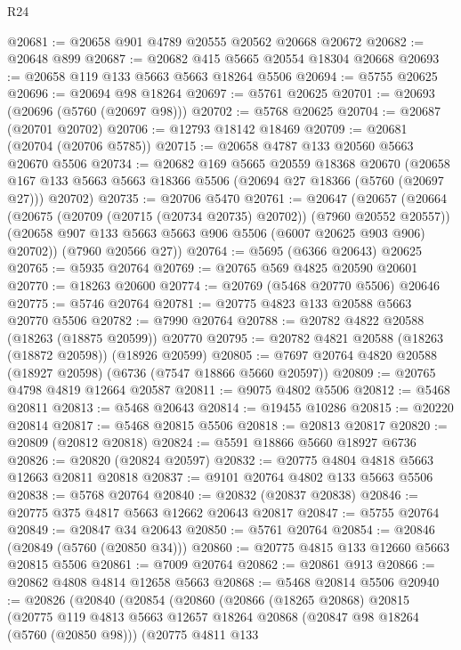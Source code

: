\begin{lexlean}{R24}
\begin{coremodule}
@20681 := @20658 @901 @4789 @20555 @20562 @20668 @20672
@20682 := @20648 @899
@20687 := @20682 @415 @5665 @20554 @18304 @20668
@20693 := @20658 @119 @133 @5663 @5663 @18264 @5506
@20694 := @5755 @20625
@20696 := @20694 @98 @18264
@20697 := @5761 @20625
@20701 := @20693 (@20696 (@5760 (@20697 @98)))
@20702 := @5768 @20625
@20704 := @20687 (@20701 @20702)
@20706 := @12793 @18142 @18469
@20709 := @20681 (@20704 (@20706 @5785))
@20715 := @20658 @4787 @133 @20560 @5663 @20670 @5506
@20734 := @20682
    @169
    @5665
    @20559
    @18368
    @20670
    (@20658 @167 @133 @5663 @5663 @18366 @5506 (@20694 @27 @18366 (@5760 (@20697 @27))) @20702)
@20735 := @20706 @5470
@20761 := @20647
    (@20657
      (@20664
        (@20675 (@20709 (@20715 (@20734 @20735) @20702)) (@7960 @20552 @20557))
        (@20658 @907 @133 @5663 @5663 @906 @5506 (@6007 @20625 @903 @906) @20702))
      (@7960 @20566 @27))
@20764 := @5695 (@6366 @20643) @20625
@20765 := @5935 @20764
@20769 := @20765 @569 @4825 @20590 @20601
@20770 := @18263 @20600
@20774 := @20769 (@5468 @20770 @5506) @20646
@20775 := @5746 @20764
@20781 := @20775 @4823 @133 @20588 @5663 @20770 @5506
@20782 := @7990 @20764
@20788 := @20782 @4822 @20588 (@18263 (@18875 @20599)) @20770
@20795 := @20782 @4821 @20588 (@18263 (@18872 @20598)) (@18926 @20599)
@20805 := @7697 @20764 @4820 @20588 (@18927 @20598) (@6736 (@7547 @18866 @5660 @20597))
@20809 := @20765 @4798 @4819 @12664 @20587
@20811 := @9075 @4802 @5506
@20812 := @5468 @20811
@20813 := @5468 @20643
@20814 := @19455 @10286
@20815 := @20220 @20814
@20817 := @5468 @20815 @5506
@20818 := @20813 @20817
@20820 := @20809 (@20812 @20818)
@20824 := @5591 @18866 @5660 @18927 @6736
@20826 := @20820 (@20824 @20597)
@20832 := @20775 @4804 @4818 @5663 @12663 @20811 @20818
@20837 := @9101 @20764 @4802 @133 @5663 @5506
@20838 := @5768 @20764
@20840 := @20832 (@20837 @20838)
@20846 := @20775 @375 @4817 @5663 @12662 @20643 @20817
@20847 := @5755 @20764
@20849 := @20847 @34 @20643
@20850 := @5761 @20764
@20854 := @20846 (@20849 (@5760 (@20850 @34)))
@20860 := @20775 @4815 @133 @12660 @5663 @20815 @5506
@20861 := @7009 @20764
@20862 := @20861 @913
@20866 := @20862 @4808 @4814 @12658 @5663
@20868 := @5468 @20814 @5506
@20940 := @20826
    (@20840
      (@20854
        (@20860
          (@20866
            (@18265 @20868)
            @20815
            (@20775
              @119
              @4813
              @5663
              @12657
              @18264
              @20868
              (@20847 @98 @18264 (@5760 (@20850 @98)))
              (@20775
                @4811
                @133

\end{coremodule}
\end{lexlean}
